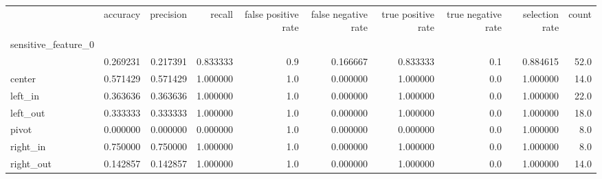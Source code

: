 \begin{tabular}{lrrrrrrrrr}
\toprule
{} &  accuracy &  precision &    recall &  false positive rate &  false negative rate &  true positive rate &  true negative rate &  selection rate &  count \\
sensitive\_feature\_0 &           &            &           &                      &                      &                     &                     &                 &        \\
\midrule
                    &  0.269231 &   0.217391 &  0.833333 &                  0.9 &             0.166667 &            0.833333 &                 0.1 &        0.884615 &   52.0 \\
center              &  0.571429 &   0.571429 &  1.000000 &                  1.0 &             0.000000 &            1.000000 &                 0.0 &        1.000000 &   14.0 \\
left\_in             &  0.363636 &   0.363636 &  1.000000 &                  1.0 &             0.000000 &            1.000000 &                 0.0 &        1.000000 &   22.0 \\
left\_out            &  0.333333 &   0.333333 &  1.000000 &                  1.0 &             0.000000 &            1.000000 &                 0.0 &        1.000000 &   18.0 \\
pivot               &  0.000000 &   0.000000 &  0.000000 &                  1.0 &             0.000000 &            0.000000 &                 0.0 &        1.000000 &    8.0 \\
right\_in            &  0.750000 &   0.750000 &  1.000000 &                  1.0 &             0.000000 &            1.000000 &                 0.0 &        1.000000 &    8.0 \\
right\_out           &  0.142857 &   0.142857 &  1.000000 &                  1.0 &             0.000000 &            1.000000 &                 0.0 &        1.000000 &   14.0 \\
\bottomrule
\end{tabular}
